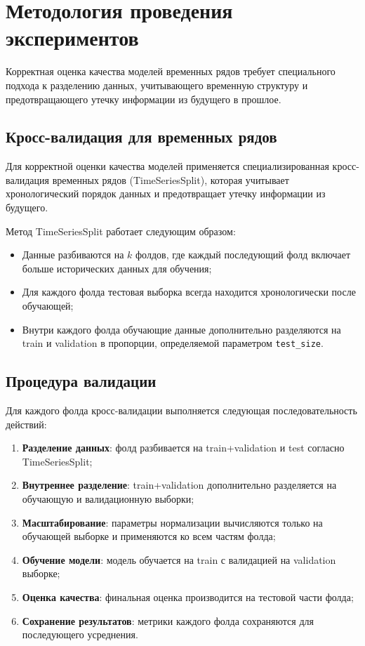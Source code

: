 \section{Методология проведения экспериментов}
\label{sec:experiment_methodology}

Корректная оценка качества моделей временных рядов требует специального подхода к разделению данных, учитывающего временную структуру и предотвращающего утечку информации из будущего в прошлое.

\subsection{Кросс-валидация для временных рядов}

Для корректной оценки качества моделей применяется специализированная кросс-валидация временных рядов (TimeSeriesSplit), которая учитывает хронологический порядок данных и предотвращает утечку информации из будущего.

Метод TimeSeriesSplit работает следующим образом:
\begin{itemize}
	\item Данные разбиваются на $k$ фолдов, где каждый последующий фолд включает больше исторических данных для обучения;
	\item Для каждого фолда тестовая выборка всегда находится хронологически после обучающей;
	\item Внутри каждого фолда обучающие данные дополнительно разделяются на train и validation в пропорции, определяемой параметром \texttt{test\_size}.
\end{itemize}

\subsection{Процедура валидации}

Для каждого фолда кросс-валидации выполняется следующая последовательность действий:
\begin{enumerate}
	\item \textbf{Разделение данных}: фолд разбивается на train+validation и test согласно TimeSeriesSplit;
	\item \textbf{Внутреннее разделение}: train+validation дополнительно разделяется на обучающую и валидационную выборки;
	\item \textbf{Масштабирование}: параметры нормализации вычисляются только на обучающей выборке и применяются ко всем частям фолда;
	\item \textbf{Обучение модели}: модель обучается на train с валидацией на validation выборке;
	\item \textbf{Оценка качества}: финальная оценка производится на тестовой части фолда;
	\item \textbf{Сохранение результатов}: метрики каждого фолда сохраняются для последующего усреднения.
\end{enumerate}

